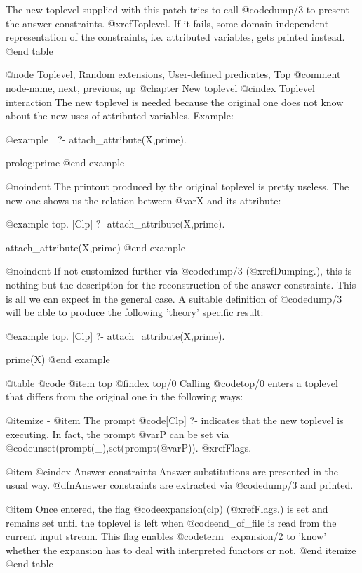 The new toplevel supplied with this patch tries to call @code{dump/3} to
present the answer constraints. @xref{Toplevel}. If it fails, some
domain independent representation of the constraints, i.e. attributed
variables, gets printed instead.
@end table


@node Toplevel, Random extensions, User-defined predicates, Top    
@comment  node-name,  next,  previous,  up
@chapter New toplevel
@cindex Toplevel interaction
The new toplevel is needed because the original one does not know about
the new uses of attributed variables. Example:

@example
| ?- attach_attribute(X,prime).

prolog:prime
@end example

@noindent
The printout produced by the original toplevel is pretty useless.
The new one shows us the relation between @var{X} and its attribute:

@example
top.
[Clp] ?- attach_attribute(X,prime).

attach_attribute(X,prime)
@end example

@noindent
If not customized further via @code{dump/3} (@xref{Dumping}.), this is
nothing but the description for the reconstruction of the answer
constraints. This is all we can expect in the general case.  A suitable
definition of @code{dump/3} will be able to produce the following
'theory' specific result:

@example
top.
[Clp] ?- attach_attribute(X,prime).

prime(X)
@end example

@table @code
@item top
@findex top/0
Calling @code{top/0} enters a toplevel that differs from the original
one in the following ways:

@itemize -
@item
The prompt @code{[Clp] ?-} indicates that the new toplevel is executing.
In fact, the prompt @var{P} can be set via
@code{unset(prompt(_),set(prompt(@var{P}))}. @xref{Flags}.

@item
@cindex Answer constraints
Answer substitutions are presented in the usual way. @dfn{Answer
constraints} are extracted via @code{dump/3} and printed.

@item 
Once entered, the flag @code{expansion(clp)} (@xref{Flags}.) is set and
remains set until the toplevel is left when @code{end_of_file} is read
from the current input stream. This flag enables @code{term_expansion/2}
to 'know' whether the expansion has to deal with interpreted functors or
not.
@end itemize
@end table

